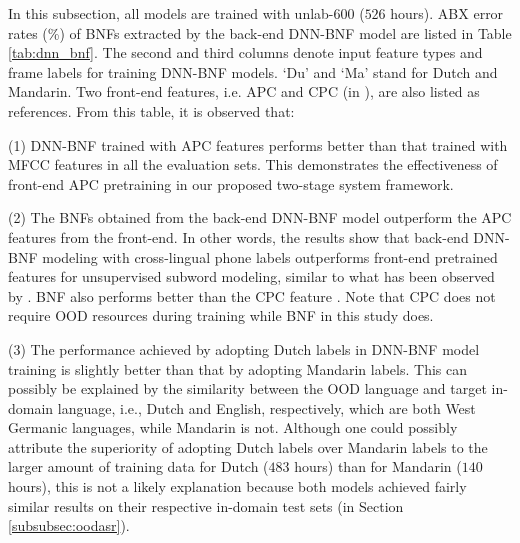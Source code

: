 \documentclass[a4paper]{article}
\begin{document}
In this subsection, all models are trained with unlab-600 ($526$ hours).
ABX error rates (\%) of BNFs extracted by the back-end DNN-BNF model are listed in Table \ref{tab:dnn_bnf}. The second and third columns  denote input feature types and frame labels for training DNN-BNF models. `Du' and `Ma' stand for Dutch and Mandarin. 
Two front-end features, i.e. APC and CPC (in \cite{kahn2019librilight}),  are also listed as references.
   From this table, it is observed  that:

(1) DNN-BNF trained with APC features performs better than that trained with MFCC features in all the evaluation sets. This  demonstrates the effectiveness of front-end APC pretraining in our proposed two-stage system framework.

(2) The BNFs obtained from the back-end DNN-BNF model outperform the APC features from the front-end. In other words, the results show that
back-end DNN-BNF modeling with cross-lingual phone labels
outperforms front-end  pretrained features for unsupervised subword modeling, similar to what has been observed by \cite{shibata2017composite,feng2019_TASLP}. BNF also performs better than the   CPC feature    \cite{kahn2019librilight}. Note that CPC does not require OOD resources during training while BNF in this study does. 

(3) The performance achieved by adopting Dutch labels in DNN-BNF model training is slightly better than that by adopting Mandarin labels. 
This can possibly be explained by the similarity between the OOD language and target in-domain language, i.e., Dutch and English, respectively, which are both West Germanic languages, while Mandarin is not. 
Although one could 
possibly 
attribute the superiority of adopting Dutch labels over Mandarin labels to the larger amount of training data for Dutch ($483$ hours) than for Mandarin ($140$ hours), this is not a likely explanation because both models achieved fairly similar 
results 
on their respective in-domain test sets (in Section \ref{subsubsec:oodasr}).
\end{document}
